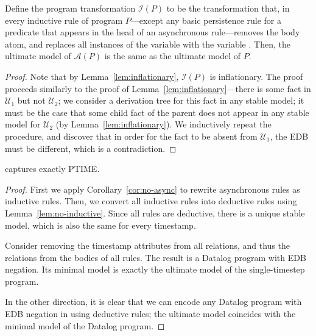 \begin{lemma}
\label{lem:no-inductive}
Define the program transformation $\mathcal{I}(P)$ to be the transformation that, in every inductive rule of \slang program $P$---except any basic persistence rule for a predicate that appears in the head of an asynchronous rule---removes the  body atom, and replaces all instances of the variable  with the variable .  Then, the ultimate model of $\mathcal{A}(P)$ is the same as the ultimate model of $P$.
\end{lemma}
\begin{proof}
Note that by Lemma~\ref{lem:inflationary}, $\mathcal{I}(P)$ is inflationary.  The proof proceeds similarly to the proof of Lemma~\ref{lem:inflationary}---there is some fact in $\mathcal{U}_1$ but not $\mathcal{U}_2$; we consider a derivation tree for this fact in any stable model; it must be the case that some child fact of the parent does not appear in any stable model for $\mathcal{U}_2$ (by Lemma~\ref{lem:inflationary}).  We inductively repeat the procedure, and discover that in order for the fact to be absent from $\mathcal{U}_1$, the EDB must be different, which is a contradiction.
\end{proof}


\begin{theorem}
\label{thm:ptime}
\slang captures exactly PTIME.
\end{theorem}
\begin{proof}
First we apply Corollary~\ref{cor:no-async} to rewrite asynchronous rules as inductive rules.  Then, we convert all inductive rules into deductive rules using Lemma~\ref{lem:no-inductive}.  Since all rules are deductive, there is a unique stable model, which is also the same for every timestamp.

Consider removing the timestamp attributes from all relations, and thus the  relations from the bodies of all rules.  The result is a Datalog program with EDB negation.  Its minimal model is exactly the ultimate model of the single-timestep \slang program.

In the other direction, it is clear that we can encode any Datalog program with EDB negation in \slang using deductive rules; the ultimate model coincides with the minimal model of the Datalog program.
\end{proof}



